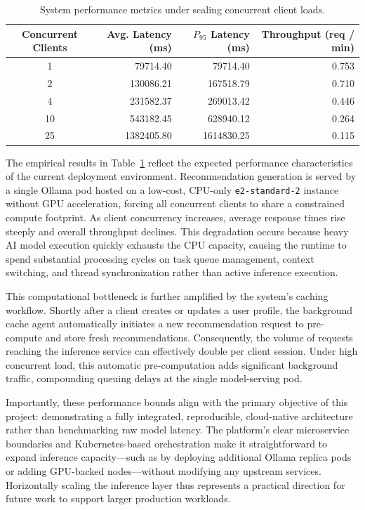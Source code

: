 \documentclass[10pt]{llncs}
\begin{document}
\begin{table}[t]
\centering
\setlength{\tabcolsep}{14pt} 
\renewcommand{\arraystretch}{1.15} 
\begin{tabular}{c r r r}
\toprule
\textbf{Concurrent Clients} & \textbf{Avg. Latency (ms)} & \textbf{$P_{95}$ Latency (ms)} & \textbf{Throughput (req / min)} \\
\midrule
1   & 79714.40 & 79714.40 & 0.753 \\
2   & 130086.21 & 167518.79 & 0.710 \\
4   & 231582.37 & 269013.42 & 0.446 \\
10  & 543182.45 & 628940.12 & 0.264 \\
25  & 1382405.80 & 1614830.25 & 0.115 \\
\bottomrule
\end{tabular}
\vspace{10pt}
\caption{System performance metrics under scaling concurrent client loads.}
\label{tab:load_test_results}
\end{table}

The empirical results in Table~\ref{tab:load_test_results} reflect the expected performance characteristics of the current deployment environment. Recommendation generation is served by a single Ollama pod hosted on a low-cost, CPU-only \texttt{e2-standard-2} instance without GPU acceleration, forcing all concurrent clients to share a constrained compute footprint. As client concurrency increases, average response times rise steeply and overall throughput declines. This degradation occurs because heavy AI model execution quickly exhausts the CPU capacity, causing the runtime to spend substantial processing cycles on task queue management, context switching, and thread synchronization rather than active inference execution.

This computational bottleneck is further amplified by the system's caching workflow. Shortly after a client creates or updates a user profile, the background cache agent automatically initiates a new recommendation request to pre-compute and store fresh recommendations. Consequently, the volume of requests reaching the inference service can effectively double per client session. Under high concurrent load, this automatic pre-computation adds significant background traffic, compounding queuing delays at the single model-serving pod.

Importantly, these performance bounds align with the primary objective of this project: demonstrating a fully integrated, reproducible, cloud-native architecture rather than benchmarking raw model latency. The platform's clear microservice boundaries and Kubernetes-based orchestration make it straightforward to expand inference capacity—such as by deploying additional Ollama replica pods or adding GPU-backed nodes—without modifying any upstream services. Horizontally scaling the inference layer thus represents a practical direction for future work to support larger production workloads.
\end{document}
